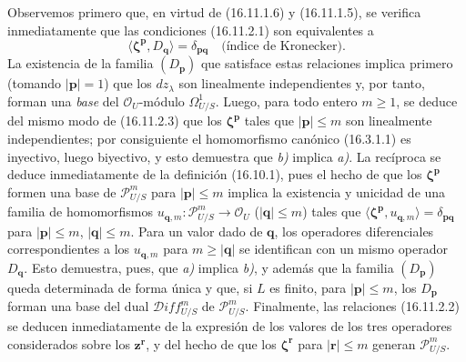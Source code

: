 Observemos primero que, en virtud de (16.11.1.6) y (16.11.1.5), se verifica
inmediatamente que las condiciones (16.11.2.1) son equivalentes a
\[
  \langle\boldsymbol{\zeta}^{\mathbf{p}},D_{\mathbf{q}}\rangle
  =\delta_{\mathbf{p}\mathbf{q}}
  \quad\text{(índice de Kronecker)}.
  \tag{16.11.2.3}
  \label{IV.16.11.2.3}
\]
La existencia de la familia $(D_{\mathbf{p}})$ que satisface estas relaciones
implica primero (tomando $|\mathbf{p}|=1$) que los $dz_\lambda$ son
linealmente independientes y, por tanto, forman una \emph{base} del
$\mathcal{O}_U$-módulo $\varOmega_{U/S}^1$. Luego, para todo entero $m\geq1$, se
deduce del mismo modo de (16.11.2.3) que los $\boldsymbol{\zeta}^{\mathbf{p}}$
tales que $|\mathbf{p}|\leq m$ son linealmente independientes; por consiguiente
el homomorfismo canónico (16.3.1.1) es inyectivo, luego biyectivo, y esto
demuestra que \emph{b)} implica \emph{a)}. La recíproca se deduce inmediatamente de la
definición (16.10.1), pues el hecho de que los $\boldsymbol{\zeta}^{\mathbf{p}}$
formen una base de $\mathscr{P}_{U/S}^m$ para $|\mathbf{p}|\leq m$ implica la
existencia y unicidad de una familia de homomorfismos
$u_{\mathbf{q},m}:\mathscr{P}_{U/S}^m\to\mathcal{O}_U$
($|\mathbf{q}|\leq m$) tales que
$\langle\boldsymbol{\zeta}^{\mathbf{p}},u_{\mathbf{q},m}\rangle
=\delta_{\mathbf{p}\mathbf{q}}$ para $|\mathbf{p}|\leq m$,
$|\mathbf{q}|\leq m$. Para un valor dado de $\mathbf{q}$, los operadores
diferenciales correspondientes a los $u_{\mathbf{q},m}$ para
$m\geq|\mathbf{q}|$ se identifican con un mismo operador $D_{\mathbf{q}}$.
Esto demuestra, pues, que \emph{a)} implica \emph{b)}, y además que la familia
$(D_{\mathbf{p}})$ queda determinada de forma única y que, si $L$ es finito,
para $|\mathbf{p}|\leq m$, los $D_{\mathbf{p}}$ forman una base del dual
$\mathscr{D}\!iff_{U/S}^m$ de $\mathscr{P}_{U/S}^m$. Finalmente, las relaciones
(16.11.2.2) se deducen inmediatamente de la expresión de los valores de los tres
operadores considerados sobre los $\mathbf{z}^{\mathbf{r}}$, y del hecho de que
los $\boldsymbol{\zeta}^{\mathbf{r}}$ para $|\mathbf{r}|\leq m$ generan
$\mathscr{P}_{U/S}^m$.


